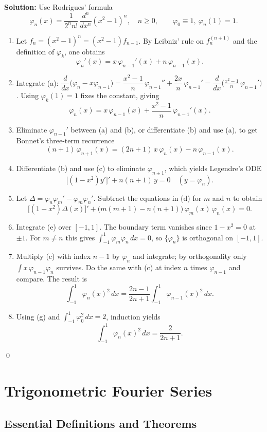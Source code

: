 \bigskip\noindent\textbf{Solution:}
Use Rodrigues' formula
\[
\varphi_n(x)=\frac{1}{2^{n} n!}\,\frac{d^n}{dx^n}(x^2-1)^n,\quad n\ge0,\qquad \varphi_0\equiv1,\ \varphi_n(1)=1.
\]
\begin{enumerate}[label=(\alph*)]
\item Let $f_n=(x^2-1)^n=(x^2-1)f_{n-1}$. By Leibniz' rule on $f_n^{(n+1)}$ and the definition of $\varphi_k$, one obtains
\[
\varphi_n'(x)=x\,\varphi_{n-1}'(x)+n\,\varphi_{n-1}(x).
\]
\item Integrate (a): $\dfrac{d}{dx}\big(\varphi_n - x\varphi_{n-1}\big) = \dfrac{x^2-1}{n}\,\varphi_{n-1}'' + \dfrac{2x}{n}\,\varphi_{n-1}' = \dfrac{d}{dx}\Big( \frac{x^2-1}{n}\,\varphi_{n-1}' \Big)$. Using $\varphi_k(1)=1$ fixes the constant, giving
\[
\varphi_n(x)=x\,\varphi_{n-1}(x)+\frac{x^2-1}{n}\,\varphi_{n-1}'(x).
\]
\item Eliminate $\varphi_{n-1}'$ between (a) and (b), or differentiate (b) and use (a), to get Bonnet's three-term recurrence
\[
(n+1)\,\varphi_{n+1}(x)=(2n+1)\,x\,\varphi_n(x)-n\,\varphi_{n-1}(x).
\]
\item Differentiate (b) and use (c) to eliminate $\varphi_{n\pm1}$, which yields Legendre's ODE
\[
\big[(1-x^2)y'\big]' + n(n+1)\,y=0\quad (y=\varphi_n).
\]
\item Let $\Delta=\varphi_n\varphi_m'-\varphi_m\varphi_n'$. Subtract the equations in (d) for $m$ and $n$ to obtain
\[
\big[(1-x^2)\Delta(x)\big]'+\big(m(m+1)-n(n+1)\big)\,\varphi_m(x)\,\varphi_n(x)=0.
\]
\item Integrate (e) over $[-1,1]$. The boundary term vanishes since $1-x^2=0$ at $\pm1$. For $m\ne n$ this gives $\int_{-1}^1\varphi_m\varphi_n\,dx=0$, so $\{\varphi_n\}$ is orthogonal on $[-1,1]$.
\item Multiply (c) with index $n-1$ by $\varphi_n$ and integrate; by orthogonality only $\int x\,\varphi_{n-1}\varphi_n$ survives. Do the same with (c) at index $n$ times $\varphi_{n-1}$ and compare. The result is
\[
\int_{-1}^1 \varphi_n(x)^2\,dx=\frac{2n-1}{2n+1}\int_{-1}^1 \varphi_{n-1}(x)^2\,dx.
\]
\item Using (g) and $\int_{-1}^1\varphi_0^2\,dx=2$, induction yields
\[
\int_{-1}^1 \varphi_n(x)^2\,dx=\frac{2}{2n+1}.
\]
\end{enumerate}\qed
\section{Trigonometric Fourier Series}

\subsection*{Essential Definitions and Theorems}

